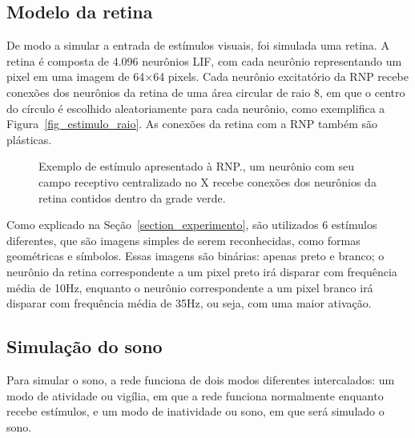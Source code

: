 \subsection{Modelo da retina}\label{subsection_retina}

De modo a simular a entrada de estímulos visuais, foi simulada uma retina. A retina é composta de 4.096 neurônios LIF, com cada
neurônio representando um pixel em uma imagem de 64$\times$64 pixels. Cada neurônio excitatório da RNP recebe conexões dos
neurônios da retina de uma área circular de raio 8, em que o centro do círculo é escolhido aleatoriamente para cada neurônio, como
exemplifica a Figura~\ref{fig_estimulo_raio}. As conexões da retina com a RNP também são plásticas.

\begin{figure}[!ht]
\caption{Exemplo de estímulo apresentado à RNP.\@Aqui, um neurônio com seu campo receptivo centralizado no X recebe conexões dos neurônios da retina contidos dentro da grade verde.}
\end{figure}

Como explicado na Seção~\ref{section_experimento}, são utilizados 6 estímulos diferentes, que são imagens simples de serem
reconhecidas, como formas geométricas e símbolos. Essas imagens são binárias: apenas preto e branco; o neurônio da retina
correspondente a um pixel preto irá disparar com frequência média de 10Hz, enquanto o neurônio correspondente a um pixel branco
irá disparar com frequência média de 35Hz, ou seja, com uma maior ativação.

\subsection{Simulação do sono}\label{subsection_sono}

Para simular o sono, a rede funciona de dois modos diferentes intercalados: um modo de atividade ou vigília, em que a rede
funciona normalmente enquanto recebe estímulos, e um modo de inatividade ou sono, em que será simulado o sono. 

